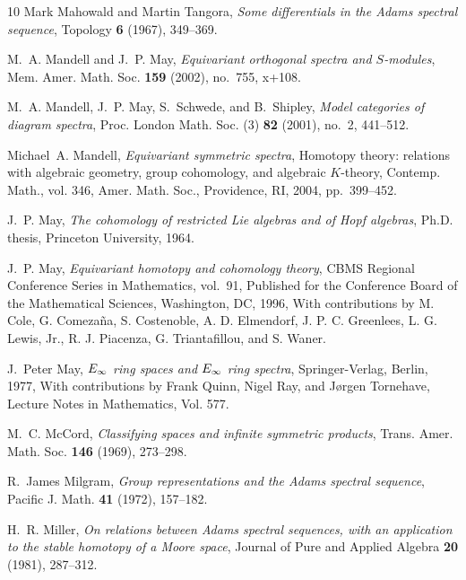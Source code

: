 \documentclass{amsart}
\theoremstyle{definition}
\theoremstyle{remark}
\begin{document}
\begin{thebibliography}{10}
Mark Mahowald and Martin Tangora, \emph{Some differentials in the {A}dams
  spectral sequence}, Topology \textbf{6} (1967), 349--369. 

M.~A. Mandell and J.~P. May, \emph{Equivariant orthogonal spectra and
  {$S$}-modules}, Mem. Amer. Math. Soc. \textbf{159} (2002), no.~755, x+108.

M.~A. Mandell, J.~P. May, S.~Schwede, and B.~Shipley, \emph{Model categories of
  diagram spectra}, Proc. London Math. Soc. (3) \textbf{82} (2001), no.~2,
  441--512. 

Michael~A. Mandell, \emph{Equivariant symmetric spectra}, Homotopy theory:
  relations with algebraic geometry, group cohomology, and algebraic
  {$K$}-theory, Contemp. Math., vol. 346, Amer. Math. Soc., Providence, RI,
  2004, pp.~399--452. 

J.~P. May, \emph{The cohomology of restricted {Lie} algebras and of {Hopf}
  algebras}, Ph.D. thesis, Princeton University, 1964.

J.~P. May, \emph{Equivariant homotopy and cohomology theory}, CBMS Regional
  Conference Series in Mathematics, vol.~91, Published for the Conference Board
  of the Mathematical Sciences, Washington, DC, 1996, With contributions by M.
  Cole, G. Comeza{\~n}a, S. Costenoble, A. D. Elmendorf, J. P. C. Greenlees, L.
  G. Lewis, Jr., R. J. Piacenza, G. Triantafillou, and S. Waner. 

J.~Peter May, \emph{${E}\sb{\infty }$ ring spaces and ${E}\sb{\infty }$ ring
  spectra}, Springer-Verlag, Berlin, 1977, With contributions by Frank Quinn,
  Nigel Ray, and J\o rgen Tornehave, Lecture Notes in Mathematics, Vol. 577.

M.~C. McCord, \emph{Classifying spaces and infinite symmetric products}, Trans.
  Amer. Math. Soc. \textbf{146} (1969), 273--298. 

R.~James Milgram, \emph{Group representations and the {A}dams spectral
  sequence}, Pacific J. Math. \textbf{41} (1972), 157--182. 

H.~R. Miller, \emph{On relations between {Adams} spectral sequences, with an
  application to the stable homotopy of a {Moore} space}, Journal of Pure and
  Applied Algebra \textbf{20} (1981), 287--312.


\end{thebibliography}
\end{document}
